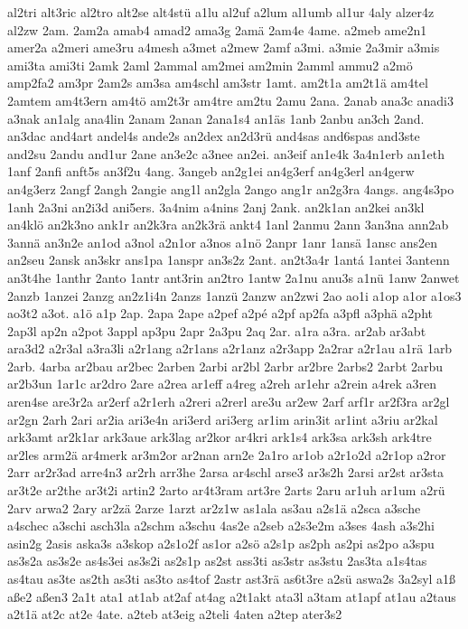 {al2tri
alt3ric
al2tro
alt2se
alt4stü
a1lu
al2uf
a2lum
al1umb
al1ur
4aly
alzer4z
al2zw
2am.
2am2a
amab4
amad2
ama3g
2amä
2am4e
4ame.
a2meb
ame2n1
amer2a
a2meri
ame3ru
a4mesh
a3met
a2mew
2amf
a3mi.
a3mie
2a3mir
a3mis
ami3ta
ami3ti
2amk
2aml
2ammal
am2mei
am2min
2amml
ammu2
a2mö
amp2fa2
am3pr
2am2s
am3sa
am4schl
am3str
1amt.
am2t1a
am2t1ä
am4tel
2amtem
am4t3ern
am4tö
am2t3r
am4tre
am2tu
2amu
2ana.
2anab
ana3c
anadi3
a3nak
an1alg
ana4lin
2anam
2anan
2ana1s4
an1äs
1anb
2anbu
an3ch
2and.
an3dac
and4art
andel4s
ande2s
an2dex
an2d3rü
and4sas
and6spas
and3ste
and2su
2andu
and1ur
2ane
an3e2c
a3nee
an2ei.
an3eif
an1e4k
3a4n1erb
an1eth
1anf
2anfi
anft5s
an3f2u
4ang.
3angeb
an2g1ei
an4g3erf
an4g3erl
an4gerw
an4g3erz
2angf
2angh
2angie
ang1l
an2gla
2ango
ang1r
an2g3ra
4angs.
ang4s3po
1anh
2a3ni
an2i3d
ani5ers.
3a4nim
a4nins
2anj
2ank.
an2k1an
an2kei
an3kl
an4klö
an2k3no
ank1r
an2k3ra
an2k3rä
ankt4
1anl
2anmu
2ann
3an3na
ann2ab
3annä
an3n2e
an1od
a3nol
a2n1or
a3nos
a1nö
2anpr
1anr
1ansä
1ansc
ans2en
an2seu
2ansk
an3skr
ans1pa
1anspr
an3s2z
2ant.
an2t3a4r
1antá
1antei
3antenn
an3t4he
1anthr
2anto
1antr
ant3rin
an2tro
1antw
2a1nu
anu3s
a1nü
1anw
2anwet
2anzb
1anzei
2anzg
an2z1i4n
2anzs
1anzü
2anzw
an2zwi
2ao
ao1i
a1op
a1or
a1os3
ao3t2
a3ot.
a1ö
a1p
2ap.
2apa
2ape
a2pef
a2pé
a2pf
ap2fa
a3pfl
a3phä
a2pht
2ap3l
ap2n
a2pot
3appl
ap3pu
2apr
2a3pu
2aq
2ar.
a1ra
a3ra.
ar2ab
ar3abt
ara3d2
a2r3al
a3ra3li
a2r1ang
a2r1ans
a2r1anz
a2r3app
2a2rar
a2r1au
a1rä
1arb
2arb.
4arba
ar2bau
ar2bec
2arben
2arbi
ar2bl
2arbr
ar2bre
2arbs2
2arbt
2arbu
ar2b3un
1ar1c
ar2dro
2are
a2rea
ar1eff
a4reg
a2reh
ar1ehr
a2rein
a4rek
a3ren
aren4se
are3r2a
ar2erf
a2r1erh
a2reri
a2rerl
are3u
ar2ew
2arf
arf1r
ar2f3ra
ar2gl
ar2gn
2arh
2ari
ar2ia
ari3e4n
ari3erd
ari3erg
ar1im
arin3it
ar1int
a3riu
ar2kal
ark3amt
ar2k1ar
ark3aue
ark3lag
ar2kor
ar4kri
ark1s4
ark3sa
ark3sh
ark4tre
ar2les
arm2ä
ar4merk
ar3m2or
ar2nan
arn2e
2a1ro
ar1ob
a2r1o2d
a2r1op
a2ror
2arr
ar2r3ad
arre4n3
ar2rh
arr3he
2arsa
ar4schl
arse3
ar3s2h
2arsi
ar2st
ar3sta
ar3t2e
ar2the
ar3t2i
artin2
2arto
ar4t3ram
art3re
2arts
2aru
ar1uh
ar1um
a2rü
2arv
arwa2
2ary
ar2zä
2arze
1arzt
ar2z1w
as1ala
as3au
a2s1ä
a2sca
a3sche
a4schec
a3schi
asch3la
a2schm
a3schu
4as2e
a2seb
a2s3e2m
a3ses
4ash
a3s2hi
asin2g
2asis
aska3s
a3skop
a2s1o2f
as1or
a2sö
a2s1p
as2ph
as2pi
as2po
a3spu
as3s2a
as3s2e
as4s3ei
as3s2i
as2s1p
as2st
ass3ti
as3str
as3stu
2as3ta
a1s4tas
as4tau
as3te
as2th
as3ti
as3to
as4tof
2astr
ast3rä
as6t3re
a2sü
aswa2s
3a2syl
a1ß
aße2
aßen3
2a1t
ata1
at1ab
at2af
at4ag
a2t1akt
ata3l
a3tam
at1apf
at1au
a2taus
a2t1ä
at2c
at2e
4ate.
a2teb
at3eig
a2teli
4aten
a2tep
ater3s2
}
